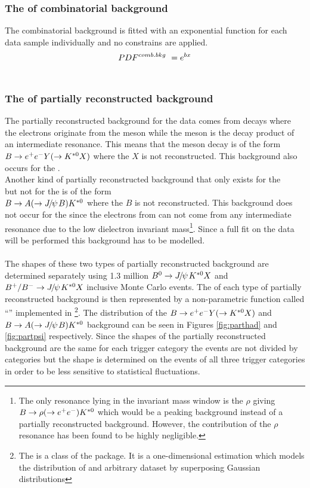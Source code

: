 \subsubsection{The \PDF of combinatorial background}
The combinatorial background is fitted with an exponential function for each data sample individually and no constrains are applied.\\
\begin{equation}
PDF^{comb. bkg} \ = e^{bx}
\end{equation}
\\
\subsubsection{The \PDF of partially reconstructed background}
The partially reconstructed background for the \BdKstee data comes from decays where the electrons originate from the \B meson while the \Kstarz meson is the decay product of an intermediate resonance. This means that the \B meson decay is of the form $B \rightarrow e^+e^- Y(\rightarrow K^{*0} X)$ where the $X$ is not reconstructed. This background also occurs for the \BdToJPsieeKst.\\
Another kind of partially reconstructed background that only exists for the\\ \BdToJPsieeKst but not for the \BdKstee is of the form\\ $B \rightarrow A (\rightarrow \jpsi B) \Kstarz$ where the $B$ is not reconstructed. This background does not occur for the \BdKstee since the electrons from \BdKstee can not come from any intermediate resonance due to the low dielectron invariant mass\footnote{The only resonance lying in the \epem invariant mass window is the $\rho$ giving $B \rightarrow \rho(\rightarrow e^+e^-) K^{*0}$ which would be a peaking background instead of a partially reconstructed background. However, the contribution of the $\rho$ resonance has been found to be highly negligible.}. Since a full fit on the \BdToJPsieeKst data will be performed this background has to be modelled. \\
\\
The shapes of these two types of partially reconstructed background are determined separately using 1.3 million $\Bd \rightarrow \jpsi \Kstarz X$ and $\Bu / \Bub \rightarrow \jpsi \Kstarz X$ inclusive Monte Carlo events. The \PDF of each type of partially reconstructed background is then represented by a non-parametric function called ``\roopdf ''\cite{rookeys} implemented in \root \footnote{The \roopdf is a class of the \roofit package. It is a one-dimensional estimation which models the distribution of and arbitrary dataset by superposing Gaussian distributions}. The distribution of the $B \rightarrow e^+e^- Y(\rightarrow K^{*0} X)$ and\\ $B \rightarrow A (\rightarrow \jpsi B) \Kstarz$ background can be seen in Figures \ref{fig:parthad} and \ref{fig:partpsi} respectively. Since the shapes of the partially reconstructed background are the same for each trigger category the events are not divided by categories but the shape is determined on the events of all three trigger categories in order to be less sensitive to statistical fluctuations.
